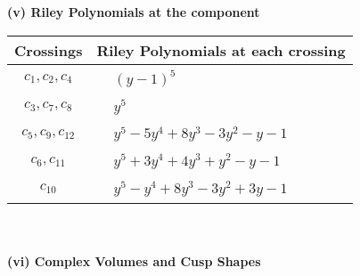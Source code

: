 \documentclass[1p]{elsarticle_modified}
\theoremstyle{definition}
\begin{document}
\newpage\renewcommand{\arraystretch}{1}
\flushleft \textbf{(v) Riley Polynomials at the component}\newline \\
\begin{tabular}{m{50pt}|m{274pt}}
Crossings & \hspace{64pt}Riley Polynomials at each crossing \\
\hline $$\begin{aligned}c_{1},c_{2},c_{4}\end{aligned}$$&$\begin{aligned}
&(y-1)^5
\end{aligned}$\\
\hline $$\begin{aligned}c_{3},c_{7},c_{8}\end{aligned}$$&$\begin{aligned}
&y^5
\end{aligned}$\\
\hline $$\begin{aligned}c_{5},c_{9},c_{12}\end{aligned}$$&$\begin{aligned}
&y^5-5 y^4+8 y^3-3 y^2- y-1
\end{aligned}$\\
\hline $$\begin{aligned}c_{6},c_{11}\end{aligned}$$&$\begin{aligned}
&y^5+3 y^4+4 y^3+y^2- y-1
\end{aligned}$\\
\hline $$\begin{aligned}c_{10}\end{aligned}$$&$\begin{aligned}
&y^5- y^4+8 y^3-3 y^2+3 y-1
\end{aligned}$\\
\hline
\end{tabular}\\~\\
\newpage\flushleft \textbf{(vi) Complex Volumes and Cusp Shapes}
\end{document}
